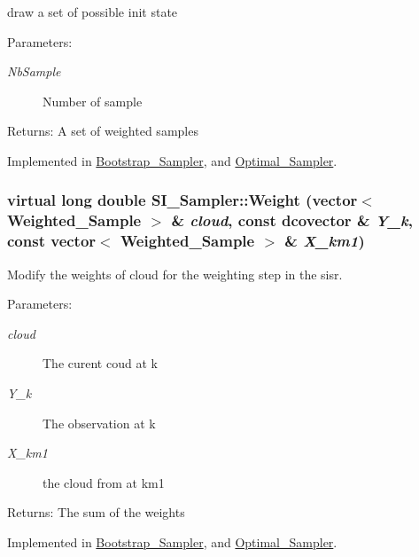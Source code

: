 draw a set of possible init state 

\begin{Desc}
\item[Parameters:]
\begin{description}
\item[{\em NbSample}]Number of sample\end{description}
\end{Desc}
\begin{Desc}
\item[Returns:]A set of weighted samples \end{Desc}


Implemented in \hyperlink{class_bootstrap___sampler_e36eb9258b052c41e075b350960d21a3}{Bootstrap\_\-Sampler}, and \hyperlink{class_optimal___sampler_d1f49e39bf83898c19c044a3874c6930}{Optimal\_\-Sampler}.\hypertarget{class_s_i___sampler_5c3a3547060d91febd3ef61969756ab6}{
\subsubsection[{Weight}]{\setlength{\rightskip}{0pt plus 5cm}virtual long double SI\_\-Sampler::Weight (vector$<$ {\bf Weighted\_\-Sample} $>$ \& {\em cloud}, \/  const dcovector \& {\em Y\_\-k}, \/  const vector$<$ {\bf Weighted\_\-Sample} $>$ \& {\em X\_\-km1})}}
\label{class_s_i___sampler_5c3a3547060d91febd3ef61969756ab6}


Modify the weights of cloud for the weighting step in the sisr. 

\begin{Desc}
\item[Parameters:]
\begin{description}
\item[{\em cloud}]The curent coud at k \item[{\em Y\_\-k}]The observation at k \item[{\em X\_\-km1}]the cloud from at km1\end{description}
\end{Desc}
\begin{Desc}
\item[Returns:]The sum of the weights \end{Desc}


Implemented in \hyperlink{class_bootstrap___sampler_22ca201b958c0c873cfdbd1d545140dc}{Bootstrap\_\-Sampler}, and \hyperlink{class_optimal___sampler_376a6addc54dd14aee7f1367c183e100}{Optimal\_\-Sampler}.

